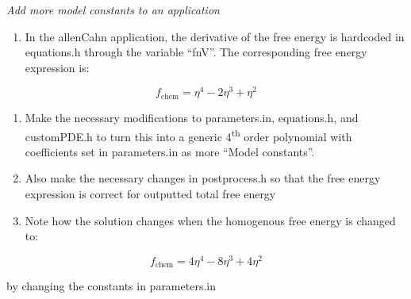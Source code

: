 \documentclass[]{article}
\begin{document}
\emph{Add more model constants to an application}

\begin{enumerate}
\def\labelenumi{\alph{enumi}.}
\item
  In the allenCahn application, the derivative of the free energy is
  hardcoded in equations.h through the variable ``fnV''. The
  corresponding free energy expression is:
\end{enumerate}

\[f_{\text{chem}} = \eta^{4} - 2\eta^{3} + \eta^{2}\]

\begin{enumerate}
\def\labelenumi{\alph{enumi}.}
\item
  Make the necessary modifications to parameters.in, equations.h, and
  customPDE.h to turn this into a generic 4\textsuperscript{th} order
  polynomial with coefficients set in parameters.in as more ``Model
  constants''.
\item
  Also make the necessary changes in postprocess.h so that the free
  energy expression is correct for outputted total free energy
\item
  Note how the solution changes when the homogenous free energy is
  changed to:
\end{enumerate}

\[f_{\text{chem}} = 4\eta^{4} - 8\eta^{3} + 4\eta^{2}\]

by changing the constants in parameters.in
\end{document}
